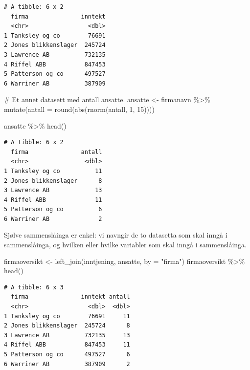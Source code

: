 \documentclass[
  letterpaper,
  DIV=11,
  numbers=noendperiod]{scrreprt}
\newenvironment{Shaded}{\begin{snugshade}}{\end{snugshade}}
\newcommand{\AttributeTok}[1]{\textcolor[rgb]{0.40,0.45,0.13}{#1}}
\newcommand{\CommentTok}[1]{\textcolor[rgb]{0.37,0.37,0.37}{#1}}
\newcommand{\DecValTok}[1]{\textcolor[rgb]{0.68,0.00,0.00}{#1}}
\newcommand{\FunctionTok}[1]{\textcolor[rgb]{0.28,0.35,0.67}{#1}}
\newcommand{\NormalTok}[1]{\textcolor[rgb]{0.00,0.23,0.31}{#1}}
\newcommand{\OtherTok}[1]{\textcolor[rgb]{0.00,0.23,0.31}{#1}}
\newcommand{\SpecialCharTok}[1]{\textcolor[rgb]{0.37,0.37,0.37}{#1}}
\newcommand{\StringTok}[1]{\textcolor[rgb]{0.13,0.47,0.30}{#1}}
\begin{document}
\begin{verbatim}
# A tibble: 6 x 2
  firma               inntekt
  <chr>                 <dbl>
1 Tanksley og co        76691
2 Jones blikkenslager  245724
3 Lawrence AB          732135
4 Riffel ABB           847453
5 Patterson og co      497527
6 Warriner AB          387909
\end{verbatim}

\begin{Shaded}
\begin{Highlighting}[]
\CommentTok{\# Et annet datasett med antall ansatte.}
\NormalTok{ansatte }\OtherTok{\textless{}{-}}\NormalTok{ firmanavn }\SpecialCharTok{\%\textgreater{}\%} 
  \FunctionTok{mutate}\NormalTok{(}\AttributeTok{antall =} \FunctionTok{round}\NormalTok{(}\FunctionTok{abs}\NormalTok{(}\FunctionTok{rnorm}\NormalTok{(antall, }\DecValTok{1}\NormalTok{, }\DecValTok{15}\NormalTok{))))}

\NormalTok{ansatte }\SpecialCharTok{\%\textgreater{}\%} \FunctionTok{head}\NormalTok{()}
\end{Highlighting}
\end{Shaded}

\begin{verbatim}
# A tibble: 6 x 2
  firma               antall
  <chr>                <dbl>
1 Tanksley og co          11
2 Jones blikkenslager      8
3 Lawrence AB             13
4 Riffel ABB              11
5 Patterson og co          6
6 Warriner AB              2
\end{verbatim}

Sjølve sammenslåinga er enkel: vi navngir de to datasetta som skal inngå
i sammenslåinga, og hvilken eller hvilke variabler som skal inngå i
sammenslåinga.

\begin{Shaded}
\begin{Highlighting}[]
\NormalTok{firmaoversikt }\OtherTok{\textless{}{-}} \FunctionTok{left\_join}\NormalTok{(inntjening, ansatte, }\AttributeTok{by =} \StringTok{"firma"}\NormalTok{)}
\NormalTok{firmaoversikt }\SpecialCharTok{\%\textgreater{}\%} \FunctionTok{head}\NormalTok{()}
\end{Highlighting}
\end{Shaded}

\begin{verbatim}
# A tibble: 6 x 3
  firma               inntekt antall
  <chr>                 <dbl>  <dbl>
1 Tanksley og co        76691     11
2 Jones blikkenslager  245724      8
3 Lawrence AB          732135     13
4 Riffel ABB           847453     11
5 Patterson og co      497527      6
6 Warriner AB          387909      2
\end{verbatim}
\end{document}
